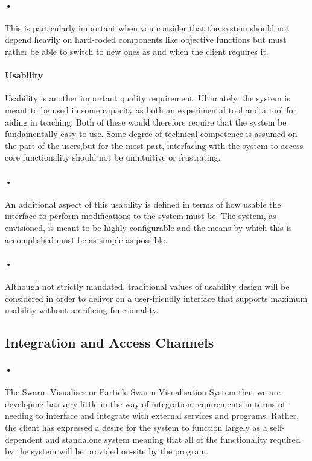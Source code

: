 \documentclass[11pt]{article}
\begin{document}
\paragraph{•}
This is particularly important when you consider that the system should not depend heavily on hard-coded components like objective functions but must rather be able to switch to new ones as and when the client requires it.

\paragraph{Usability}
Usability is another important quality requirement. Ultimately, the system is meant to be used in some capacity as both an experimental tool and a tool for aiding in teaching. Both of these would therefore require that the system be fundamentally easy to use. Some degree of technical competence is assumed on the part of the users,but for the most part, interfacing with the system to access core functionality should not be unintuitive or frustrating. 

\paragraph{•}
An additional aspect of this usability is defined in terms of how usable the interface to perform modifications to the system must be. The system, as envisioned, is meant to be highly configurable and the means by which this is accomplished must be as simple as possible. 

\paragraph{•}
Although not strictly mandated, traditional values of usability design will be considered in order to deliver on a user-friendly interface that supports maximum usability without sacrificing functionality.
\subsection{Integration and Access Channels}
\paragraph{•}
The Swarm Visualiser or Particle Swarm Visualisation System that we are developing has very little in the way of integration requirements in terms of needing to interface and integrate with external services and programs. Rather, the client has expressed a desire for the system to function largely as a self-dependent and standalone system meaning that all of the functionality required by the system will be provided on-site by the program.
\end{document}
